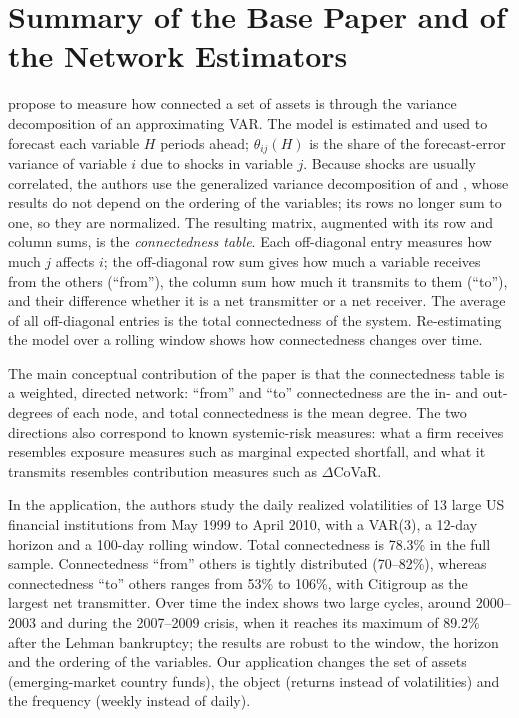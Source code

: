 \section*{Summary of the Base Paper and of the Network Estimators}

\citet{diebold2014network} propose to measure how connected a set of assets is through the variance decomposition of an approximating VAR. The model is estimated and used to forecast each variable $H$ periods ahead; $\theta_{ij}(H)$ is the share of the forecast-error variance of variable $i$ due to shocks in variable $j$. Because shocks are usually correlated, the authors use the generalized variance decomposition of \citet{koop1996impulse} and \citet{pesaran1998generalized}, whose results do not depend on the ordering of the variables; its rows no longer sum to one, so they are normalized. The resulting matrix, augmented with its row and column sums, is the \emph{connectedness table}. Each off-diagonal entry measures how much $j$ affects $i$; the off-diagonal row sum gives how much a variable receives from the others (``from''), the column sum how much it transmits to them (``to''), and their difference whether it is a net transmitter or a net receiver. The average of all off-diagonal entries is the total connectedness of the system. Re-estimating the model over a rolling window shows how connectedness changes over time.

The main conceptual contribution of the paper is that the connectedness table is a weighted, directed network: ``from'' and ``to'' connectedness are the in- and out-degrees of each node, and total connectedness is the mean degree. The two directions also correspond to known systemic-risk measures: what a firm receives resembles exposure measures such as marginal expected shortfall, and what it transmits resembles contribution measures such as $\Delta$CoVaR.

In the application, the authors study the daily realized volatilities of 13 large US financial institutions from May 1999 to April 2010, with a VAR(3), a 12-day horizon and a 100-day rolling window. Total connectedness is 78.3\% in the full sample. Connectedness ``from'' others is tightly distributed (70--82\%), whereas connectedness ``to'' others ranges from 53\% to 106\%, with Citigroup as the largest net transmitter. Over time the index shows two large cycles, around 2000--2003 and during the 2007--2009 crisis, when it reaches its maximum of 89.2\% after the Lehman bankruptcy; the results are robust to the window, the horizon and the ordering of the variables. Our application changes the set of assets (emerging-market country funds), the object (returns instead of volatilities) and the frequency (weekly instead of daily).

